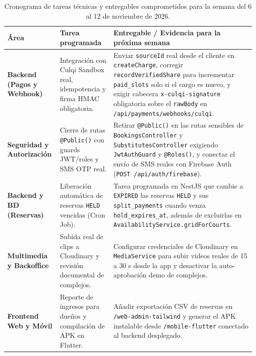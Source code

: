 \documentclass[10pt,a4paper]{article}
\begin{document}
\vspace{0.15cm}
\begin{table}[h!]
\centering
\small
\begin{tabular}{|p{}|p{}|p{}|}
\hline
\textbf{Área} & \textbf{Tarea programada} & \textbf{Entregable / Evidencia para la próxima semana} \\
\hline
\textbf{Backend (Pagos y Webhook)} & Integración con Culqi Sandbox real, idempotencia y firma HMAC obligatoria. & Enviar \texttt{sourceId} real desde el cliente en \texttt{createCharge}, corregir \texttt{recordVerifiedShare} para incrementar \texttt{paid\_slots} solo si el cargo es nuevo, y exigir cabecera \texttt{x-culqi-signature} obligatoria sobre el \texttt{rawBody} en \texttt{/api/payments/webhooks/culqi}. \\
\hline
\textbf{Seguridad y Autorización} & Cierre de rutas \texttt{@Public()} con guards JWT/roles y SMS OTP real. & Retirar \texttt{@Public()} en las rutas sensibles de \texttt{BookingsController} y \texttt{SubstitutesController} exigiendo \texttt{JwtAuthGuard} y \texttt{@Roles()}, y conectar el envío de SMS reales con Firebase Auth (\texttt{POST /api/auth/firebase}). \\
\hline
\textbf{Backend y BD (Reservas)} & Liberación automática de reservas \texttt{HELD} vencidas (Cron Job). & Tarea programada en NestJS que cambie a \texttt{EXPIRED} las reservas \texttt{HELD} y sus \texttt{split\_payments} cuando venza \texttt{hold\_expires\_at}, además de excluirlas en \texttt{AvailabilityService.gridForCourts}. \\
\hline
\textbf{Multimedia y Backoffice} & Subida real de clips a Cloudinary y revisión documental de complejos. & Configurar credenciales de Cloudinary en \texttt{MediaService} para subir videos reales de 15 a 30 s desde la app y desactivar la auto-aprobación demo de complejos. \\
\hline
\textbf{Frontend Web y Móvil} & Reporte de ingresos para dueños y compilación de APK en Flutter. & Añadir exportación CSV de reservas en \texttt{/web-admin-tailwind} y generar el APK instalable desde \texttt{/mobile-flutter} conectado al backend desplegado. \\
\hline
\end{tabular}
\caption{Cronograma de tareas técnicas y entregables comprometidos para la semana del 6 al 12 de noviembre de 2026.}
\end{table}
\end{document}
